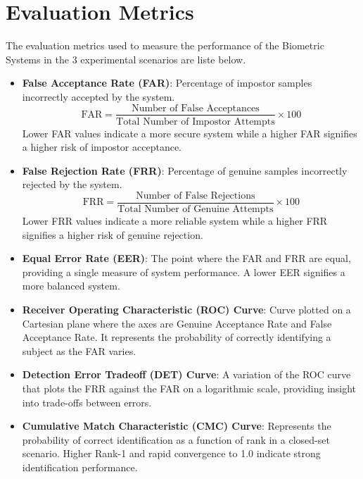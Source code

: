 \section{Evaluation Metrics}
The evaluation metrics used to measure the performance of the Biometric Systems in the 3 experimental scenarios are liste below.

\begin{itemize}

    \item \textbf{False Acceptance Rate (FAR)}:  
    Percentage of impostor samples incorrectly accepted by the system.  
    \[
    \text{FAR} = \frac{\text{Number of False Acceptances}}{\text{Total Number of Impostor Attempts}} \times 100
    \]
    Lower FAR values indicate a more secure system while a higher FAR signifies a higher risk of impostor acceptance.
    
    \item \textbf{False Rejection Rate (FRR)}:  
    Percentage of genuine samples incorrectly rejected by the system.  
    \[
    \text{FRR} = \frac{\text{Number of False Rejections}}{\text{Total Number of Genuine Attempts}} \times 100
    \]
    Lower FRR values indicate a more reliable system while a higher FRR signifies a higher risk of genuine rejection.

    \item \textbf{Equal Error Rate (EER)}:  
    The point where the FAR and FRR are equal, providing a single measure of system performance.  
    A lower EER signifies a more balanced system.

    \item \textbf{Receiver Operating Characteristic (ROC) Curve}:  
    Curve plotted on a Cartesian plane where the axes are Genuine Acceptance Rate and False Acceptance Rate. It represents the probability of correctly identifying a subject as the FAR varies.

    \item \textbf{Detection Error Tradeoff (DET) Curve}:  
    A variation of the ROC curve that plots the FRR against the FAR on a logarithmic scale, providing insight into trade-offs between errors.

    \item \textbf{Cumulative Match Characteristic (CMC) Curve}:  
    Represents the probability of correct identification as a function of rank in a closed-set scenario. Higher Rank-1 and rapid convergence to 1.0 indicate strong identification performance.


\end{itemize}
